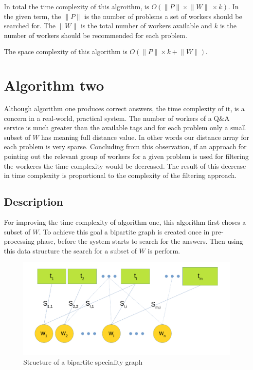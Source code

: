 \documentclass{template}
\begin{document}
In total the time complexity of this algroithm, is \(O(\lVert P \rVert \times \lVert W \rVert\ \times k) \).
In the given term, the \(\lVert P \rVert\) is the number of problems a set of workers should be searched for.
The \(\lVert W \rVert\) is the total number of workers available and \(k\) is the number of workers should be
recommended for each problem.

The space complexity of this algorithm is \(O(\lVert P \rVert \times k + \lVert W \rVert)\).

\section{Algorithm two}
\label{sec:algo-two}
Although algorithm one produces correct answers, the time complexity of it, is a concern in a real-world,
practical system. The number of workers of a Q\&A service is much greater than the available tags and for
each problem only a small subset of \(W\) has meaning full distance value. In other words our distance
array for each problem is very sparse. Concluding from this observation, if an approach for pointing out 
the relevant group of workers for a given problem is used for filtering the workeres the time complexity
would be decreased. The result of this decrease in time complexity is proportional to the complexity of 
the filtering approach.

\subsection{Description}
For improving the time complexity of algorithm one, this algorithm first choses a subset of \(W\).
To achieve this goal a bipartite graph is created once in pre-processing phase, before the system
starts to search for the answers. Then using this data structure the search for a subset of \(W\) is 
perform.

\begin{figure}
    \includegraphics[width=\linewidth]{./images/bpg.png}
    \caption{Structure of a bipartite speciality graph}
    \label{fig:bpg}
\end{figure}
\end{document}
